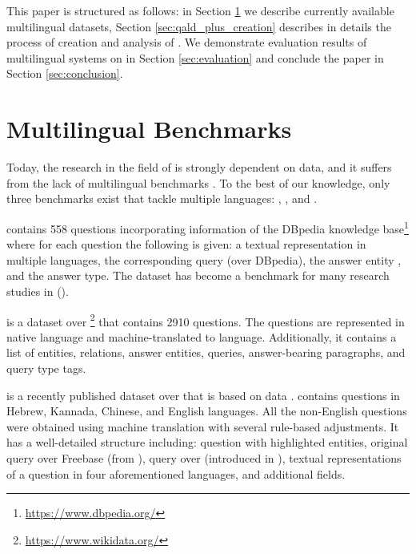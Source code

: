 \documentclass[conference]{IEEEtran}
\begin{document}
This paper is structured as follows: in Section \ref{sec:related_work} we describe currently available multilingual \KGQA datasets, Section \ref{sec:qald_plus_creation} describes in details the process of creation and analysis of \QALDplus.
We demonstrate evaluation results of multilingual \KGQA systems on \QALDplus in Section \ref{sec:evaluation} and conclude the paper in Section \ref{sec:conclusion}.
\section{Multilingual \KGQA Benchmarks}\label{sec:related_work}


Today, the research in the field of \KGQA is strongly dependent on data, and it suffers from the lack of multilingual benchmarks \cite{loginovaMT,LackOfQADatasetsBioMed}. To the best of our knowledge, only three \KGQA benchmarks exist that tackle multiple languages: \QALD \cite{QALD}, \RuBQ \cite{rubq20}, and \CWQ \cite{cui2021multilingual}.

 contains 558 questions incorporating information of the DBpedia knowledge base\footnote{\url{https://www.dbpedia.org/}} \cite{dbpedia} where for each question the following is given: a textual representation in multiple languages, the corresponding \SPARQL query (over DBpedia), the answer entity \URI, and the answer type. 
The dataset has become a benchmark for many research studies in \QA (\eg \cite{SurveyOnChallengesOfQA,DBLP:conf/icwe/DiefenbachSBC0A17,sorokin2018modeling,QAnswer,MQALD}).

 is a \KGQA dataset over \Wikidata\footnote{\url{https://www.wikidata.org/}} \cite{Wikidata} that contains 2910 questions. 
The questions are represented in native \Russian language and machine-translated to \English language.
Additionally, it contains a list of entities, relations, answer entities, \SPARQL queries, answer-bearing paragraphs, and query type tags. 

\CWQ is a recently published \KGQA dataset over \Wikidata that is based on \CFQ data \cite{keysers2019measuring}.
\CWQ contains questions in Hebrew, Kannada, Chinese, and English languages.
All the non-English questions were obtained using machine translation with several rule-based adjustments.
It has a well-detailed structure including: question with highlighted entities, original \SPARQL query over Freebase \cite{bollacker2008freebase} (from \CFQ), \SPARQL query over \Wikidata (introduced in \CWQ), textual representations of a question in four aforementioned languages, and additional fields.
\end{document}

